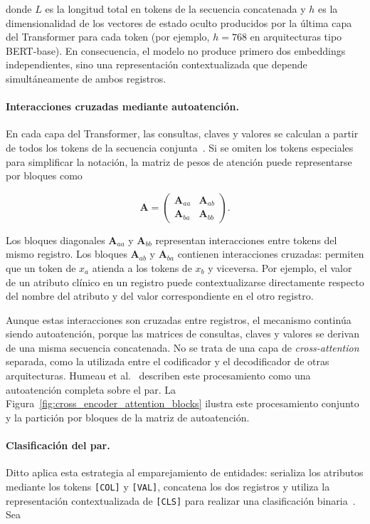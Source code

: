 donde $L$ es la longitud total en tokens de la secuencia concatenada y $h$ es la dimensionalidad de los vectores de estado oculto producidos por la última capa del Transformer para cada token (por ejemplo, $h=768$ en arquitecturas tipo BERT-base). En consecuencia, el modelo no produce primero dos embeddings independientes, sino una representación contextualizada que depende simultáneamente de ambos registros.

\paragraph{Interacciones cruzadas mediante autoatención.}
En cada capa del Transformer, las consultas, claves y valores se calculan a partir de todos los tokens de la secuencia conjunta~\cite{vaswani2017,devlin2019}. Si se omiten los tokens especiales para simplificar la notación, la matriz de pesos de atención puede representarse por bloques como

\[
\mathbf A
=
\begin{pmatrix}
\mathbf A_{aa} & \mathbf A_{ab} \\
\mathbf A_{ba} & \mathbf A_{bb}
\end{pmatrix}.
\]

Los bloques diagonales $\mathbf A_{aa}$ y $\mathbf A_{bb}$ representan interacciones entre tokens del mismo registro. Los bloques $\mathbf A_{ab}$ y $\mathbf A_{ba}$ contienen interacciones cruzadas: permiten que un token de $x_a$ atienda a los tokens de $x_b$ y viceversa. Por ejemplo, el valor de un atributo clínico en un registro puede contextualizarse directamente respecto del nombre del atributo y del valor correspondiente en el otro registro.

Aunque estas interacciones son cruzadas entre registros, el mecanismo continúa siendo autoatención, porque las matrices de consultas, claves y valores se derivan de una misma secuencia concatenada. No se trata de una capa de \textit{cross-attention} separada, como la utilizada entre el codificador y el decodificador de otras arquitecturas. Humeau et al.~\cite{humeau2020} describen este procesamiento como una autoatención completa sobre el par. La Figura~\ref{fig:cross_encoder_attention_blocks} ilustra este procesamiento conjunto y la partición por bloques de la matriz de autoatención.



\paragraph{Clasificación del par.}
Ditto aplica esta estrategia al emparejamiento de entidades: serializa los atributos mediante los tokens \texttt{[COL]} y \texttt{[VAL]}, concatena los dos registros y utiliza la representación contextualizada de \texttt{[CLS]} para realizar una clasificación binaria~\cite{li2020}. Sea

